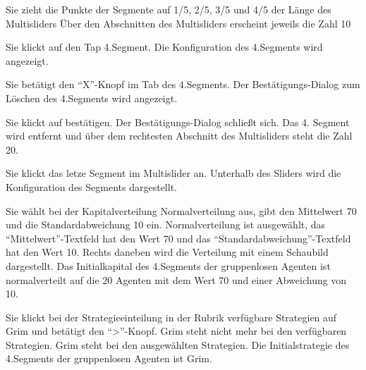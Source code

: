 \documentclass[parskip=full,11pt]{scrartcl}
\begin{document}
{Sie zieht die Punkte der Segmente auf 1/5, 2/5, 3/5 und 4/5 der Länge des Multisliders}
{Über den Abschnitten des Multisliders erscheint jeweils die Zahl 10}

{Sie klickt auf den Tap 4.Segment.}
{Die Konfiguration des 4.Segments wird angezeigt.}

{Sie betätigt den \enquote{X}-Knopf im Tab des 4.Segments.}
{Der Bestätigungs-Dialog zum Löschen des 4.Segments wird angezeigt.}

{Sie klickt auf bestätigen.}
{Der Bestätigungs-Dialog schließt sich. Das 4. Segment wird entfernt und über dem rechtesten Abschnitt des Multisliders steht die Zahl 20.}

{Sie klickt das letze Segment im Multislider an.}
{Unterhalb des Sliders wird die Konfiguration des Segments dargestellt.}

{Sie wählt bei der Kapitalverteilung Normalverteilung aus, gibt den Mittelwert 70 und die Standardabweichung 10 ein.}
{Normalverteilung ist ausgewählt, das \enquote{Mittelwert}-Textfeld hat den Wert 70 und das \enquote{Standardabweichung}-Textfeld hat den Wert 10. Rechts daneben wird die Verteilung mit einem Schaubild dargestellt. Das Initialkapital des 4.Segments der gruppenlosen Agenten ist normalverteilt auf die 20 Agenten mit dem Wert 70 und einer Abweichung von 10.}

{Sie klickt bei der Strategieeinteilung in der Rubrik verfügbare Strategien auf Grim und betätigt den \enquote{>}-Knopf.}
{Grim steht nicht mehr bei den verfügbaren Strategien. Grim steht bei den ausgewählten Strategien. Die Initialstrategie des 4.Segments der gruppenlosen Agenten ist Grim.}
\end{document}

